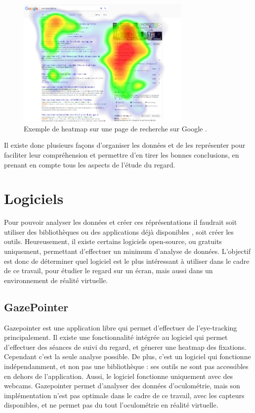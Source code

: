 \documentclass[hidelinks,12pt]{article}
\begin{document}
\begin{figure}[htpb]
  \centering
  \includegraphics[width=0.75\textwidth,keepaspectratio=true]{heatmap.png}
  \caption{Exemple de heatmap sur une page de recherche sur Google
    \cite{img_heatmap}.}
  \label{fig:heatmap}
\end{figure}

\bigskip
Il existe donc plusieurs façons d'organiser les données et de les représenter
pour faciliter leur compréhension et permettre d'en tirer les bonnes
conclusions, en prenant en compte tous les aspects de l'étude du regard.


\section{Logiciels}

Pour pouvoir analyser les données et créer ces réprésentations il faudrait soit
utiliser des bibliothèques ou des applications déjà disponibles
\cite{imotions_software}, soit créer les outils. Heureusement, il existe
certains logiciels open-source, ou gratuits uniquement, permettant d'effectuer
un minimum d'analyse de données. L'objectif est donc de déterminer quel
logiciel est le plus intéressant à utiliser dans le cadre de ce travail,
pour étudier le regard sur un écran, mais aussi dans un environnement de
réalité virtuelle.

\subsection{GazePointer}

Gazepointer \cite{gazepointer} est une application libre qui permet d'effectuer
de l'eye-tracking principalement. Il existe une fonctionnalité intégrée au
logiciel qui permet d'effectuer des séances de suivi du regard, et génerer une
heatmap des fixations. Cependant c'est la seule analyse possible. De plus,
c'est un logiciel qui fonctionne indépendamment, et non pas une bibliothèque :
ses outils ne sont pas accessibles en dehors de l'application. Aussi, le
logiciel fonctionne uniquement avec des webcams. Gazepointer permet d'analyser
des données d'oculométrie, mais son implémentation n'est pas optimale dans le
cadre de ce travail, avec les capteurs disponibles, et ne permet pas du tout
l'oculométrie en réalité virtuelle.
\end{document}
